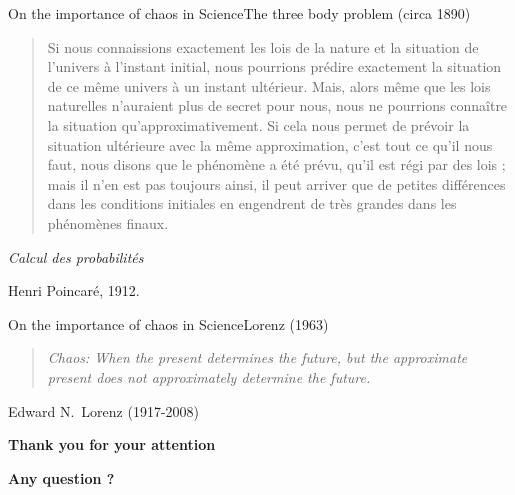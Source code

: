 \documentclass[usenames, dvipsnames, aspectratio=169]{beamer}
\begin{document}
\begin{frame}[t, c]{On the importance of chaos in Science}{The three body problem (circa 1890)}
  \vfill
  \large

  \begin{quote}
    Si nous connaissions exactement les lois de la nature et la situation de l'univers à l'instant initial, nous pourrions prédire exactement la situation de ce même univers à un instant ultérieur.
    Mais, alors même que les lois naturelles n'auraient plus de secret pour nous, nous ne pourrions connaître la situation qu'approximativement.
    Si cela nous permet de prévoir la situation ultérieure avec la même approximation, c’est tout ce qu’il nous faut, nous disons que le phénomène a été prévu, qu’il est régi par des lois ; mais il n’en est pas toujours ainsi, il peut
    arriver que de petites différences dans les conditions initiales en engendrent de très grandes dans les phénomènes finaux.
  \end{quote}
  \begin{flushright}
    \emph{Calcul des probabilités}

    Henri Poincaré, 1912.
  \end{flushright}

  \vfill
\end{frame}

\begin{frame}[t, c]{On the importance of chaos in Science}{Lorenz (1963)}
  \vfill
  \large
  
  \begin{quote}
    \emph{Chaos: When the present determines the future, but the approximate present does not approximately determine the future.}
  \end{quote}
  \begin{flushright}
    Edward N.\ Lorenz (1917-2008)
  \end{flushright}
  
  \vfill
\end{frame}

{



  \begin{frame}[fragile]{}{}
    \vfill
    \flushright
    \Large
    \textbf{\color{black} Thank you for your attention}

    \large
    \textbf{\color{gray} Any question ?}
    \vfill
  \end{frame}
}
\end{document}
